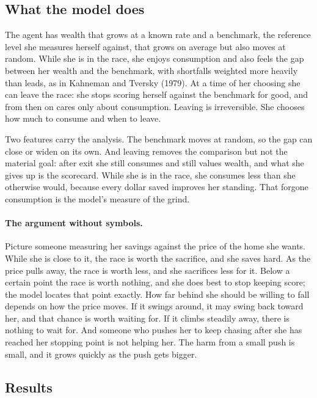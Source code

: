 \documentclass[12pt]{article}
\theoremstyle{definition}
\theoremstyle{remark}
\theoremstyle{plain}
\theoremstyle{definition}
\begin{document}
\subsection{What the model does}

The agent has wealth that grows at a known rate and a benchmark, the reference level she measures herself against, that grows on average but also moves at random. While she is in the race, she enjoys consumption and also feels the gap between her wealth and the benchmark, with shortfalls weighted more heavily than leads, as in Kahneman and Tversky (1979). At a time of her choosing she can leave the race: she stops scoring herself against the benchmark for good, and from then on cares only about consumption. Leaving is irreversible. She chooses how much to consume and when to leave.

Two features carry the analysis. The benchmark moves at random, so the gap can close or widen on its own. And leaving removes the comparison but not the material goal: after exit she still consumes and still values wealth, and what she gives up is the scorecard. While she is in the race, she consumes less than she otherwise would, because every dollar saved improves her standing. That forgone consumption is the model's measure of the grind.

\paragraph{The argument without symbols.} Picture someone measuring her savings against the price of the home she wants. While she is close to it, the race is worth the sacrifice, and she saves hard. As the price pulls away, the race is worth less, and she sacrifices less for it. Below a certain point the race is worth nothing, and she does best to stop keeping score; the model locates that point exactly. How far behind she should be willing to fall depends on how the price moves. If it swings around, it may swing back toward her, and that chance is worth waiting for. If it climbs steadily away, there is nothing to wait for. And someone who pushes her to keep chasing after she has reached her stopping point is not helping her. The harm from a small push is small, and it grows quickly as the push gets bigger.

\subsection{Results}
\end{document}
